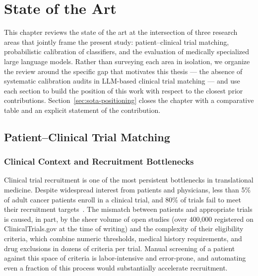
\chapter{State of the Art}
\label{chap:sota}

This chapter reviews the state of the art at the intersection of three 
research areas that jointly frame the present study: patient--clinical 
trial matching, probabilistic calibration of classifiers, and the 
evaluation of medically specialized large language models. Rather than 
surveying each area in isolation, we organize the review around the 
specific gap that motivates this thesis --- the absence of systematic 
calibration audits in LLM-based clinical trial matching --- and use 
each section to build the position of this work with respect to the 
closest prior contributions. Section~\ref{sec:sota-positioning} closes 
the chapter with a comparative table and an explicit statement of the 
contribution.

\section{Patient--Clinical Trial Matching}
\label{sec:sota-matching}

\subsection{Clinical Context and Recruitment Bottlenecks}
\label{subsec:sota-clinical}

Clinical trial recruitment is one of the most persistent bottlenecks in 
translational medicine. Despite widespread interest from patients and 
physicians, less than 5\% of adult cancer patients enroll in a clinical 
trial, and 80\% of trials fail to meet their recruitment 
targets~\cite{jin2024trialgpt}. The mismatch between patients and 
appropriate trials is caused, in part, by the sheer volume of open 
studies (over 400{,}000 registered on ClinicalTrials.gov at the time of 
writing) and the complexity of their eligibility criteria, which 
combine numeric thresholds, medical history requirements, and drug 
exclusions in dozens of criteria per trial. Manual screening of a 
patient against this space of criteria is labor-intensive and 
error-prone, and automating even a fraction of this process would 
substantially accelerate recruitment.

